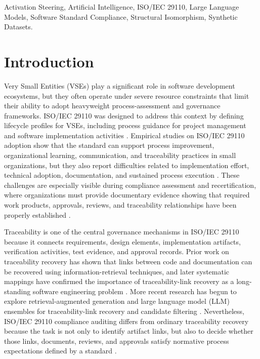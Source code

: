 \documentclass{ieeeaccess}
\begin{document}
\begin{keywords}
Activation Steering, Artificial Intelligence, ISO/IEC 29110, Large Language Models, Software Standard Compliance, Structural Isomorphism, Synthetic Datasets.
\end{keywords}

\titlepgskip=-15pt

\maketitle


\section{Introduction}
\label{sec:introduction}

Very Small Entities (VSEs) play a significant role in software development ecosystems, but they often operate under severe resource constraints that limit their ability to adopt heavyweight process-assessment and governance frameworks. ISO/IEC 29110 was designed to address this context by defining lifecycle profiles for VSEs, including process guidance for project management and software implementation activities \cite{iso29110_2024,laporte2016vse,laporte2015implementation}. Empirical studies on ISO/IEC 29110 adoption show that the standard can support process improvement, organizational learning, communication, and traceability practices in small organizations, but they also report difficulties related to implementation effort, technical adoption, documentation, and sustained process execution \cite{munoz2020implementations,101145,claudiolapuerta}. These challenges are especially visible during compliance assessment and recertification, where organizations must provide documentary evidence showing that required work products, approvals, reviews, and traceability relationships have been properly established \cite{terronmacias,11276002}.

Traceability is one of the central governance mechanisms in ISO/IEC 29110 because it connects requirements, design elements, implementation artifacts, verification activities, test evidence, and approval records. Prior work on traceability recovery has shown that links between code and documentation can be recovered using information-retrieval techniques, and later systematic mappings have confirmed the importance of traceability-link recovery as a long-standing software engineering problem \cite{antoniol2002traceability,borg2013traceability}. More recent research has begun to explore retrieval-augmented generation and large language model (LLM) ensembles for traceability-link recovery and candidate filtering \cite{fuchss2025lissa,fuchss2025llmtrace}. Nevertheless, ISO/IEC 29110 compliance auditing differs from ordinary traceability recovery because the task is not only to identify artifact links, but also to decide whether those links, documents, reviews, and approvals satisfy normative process expectations defined by a standard \cite{iso29110_2024,castellanos2022processcompliance}.
\end{document}

